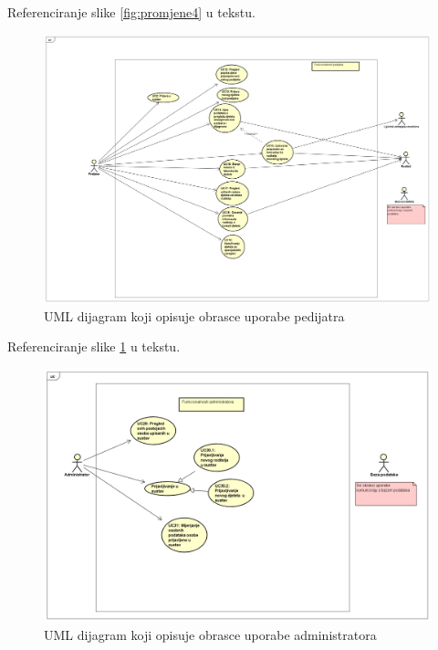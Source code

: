 					Referenciranje slike \ref{fig:promjene4} u tekstu.
					
					\begin{figure}[H]
						\includegraphics[width=\textwidth]{dijagrami/UCpedijatar.PNG} %
						\caption{UML dijagram koji opisuje obrasce uporabe pedijatra}
						\label{fig:promjene5} %
					\end{figure}
					
					Referenciranje slike \ref{fig:promjene5} u tekstu.
					
					\begin{figure}[H]
						\includegraphics[width=\textwidth]{dijagrami/UCadmin.PNG} %
						\caption{UML dijagram koji opisuje obrasce uporabe administratora}
						\label{fig:promjene6} %
					\end{figure}
					
